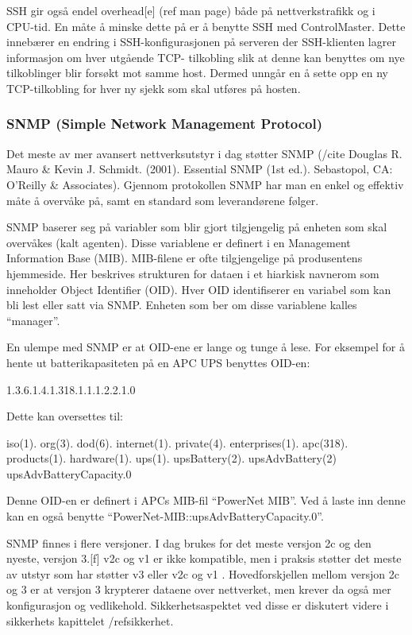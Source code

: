 SSH gir også endel overhead[e] (ref man page) både på nettverkstrafikk og i CPU-tid. En måte å minske dette på er å benytte SSH med ControlMaster. Dette innebærer en endring i SSH-konfigurasjonen på serveren der SSH-klienten lagrer informasjon om hver utgående TCP- tilkobling slik at denne kan benyttes om nye tilkoblinger blir forsøkt mot samme host. Dermed unngår en å sette opp en ny TCP-tilkobling for hver ny sjekk som skal utføres på hosten.  

\subsubsection{SNMP (Simple Network Management Protocol)}

Det meste av mer avansert nettverksutstyr i dag støtter SNMP (/cite Douglas R. Mauro \& Kevin J. Schmidt. (2001). Essential SNMP (1st ed.). Sebastopol, CA: O’Reilly \& Associates). Gjennom protokollen SNMP har man en enkel og effektiv måte å overvåke på, samt en standard som leverandørene følger. 

SNMP baserer seg på variabler som blir gjort tilgjengelig på enheten som skal overvåkes (kalt agenten). Disse variablene er definert i en Management Information Base (MIB). MIB-filene er ofte tilgjengelige på produsentens hjemmeside. Her beskrives strukturen for dataen i et hiarkisk navnerom som inneholder Object Identifier (OID). Hver OID identifiserer en variabel som kan bli lest eller satt via SNMP. Enheten som ber om disse variablene kalles “manager”. 

En ulempe med SNMP er at OID-ene er lange og tunge å lese. For eksempel for å hente ut batterikapasiteten på en APC UPS benyttes OID-en:

1.3.6.1.4.1.318.1.1.1.2.2.1.0

Dette kan oversettes til:

iso(1). org(3). dod(6). internet(1). private(4). enterprises(1). apc(318). products(1). hardware(1). ups(1). upsBattery(2). upsAdvBattery(2) upsAdvBatteryCapacity.0

Denne OID-en er definert i APCs MIB-fil “PowerNet MIB”. Ved å laste inn denne kan en også benytte “PowerNet-MIB::upsAdvBatteryCapacity.0”.

SNMP finnes i flere versjoner. I dag brukes for det meste versjon 2c og den nyeste, versjon 3.[f] v2c og v1 er ikke kompatible, men i praksis støtter det meste av utstyr som har støtter v3 eller v2c og v1 \cite{rfc3584}. Hovedforskjellen mellom versjon 2c og 3 er at versjon 3 krypterer dataene over nettverket, men krever da også mer konfigurasjon og vedlikehold. Sikkerhetsaspektet ved disse er diskutert videre i sikkerhets kapittelet /ref{sikkerhet}. 

